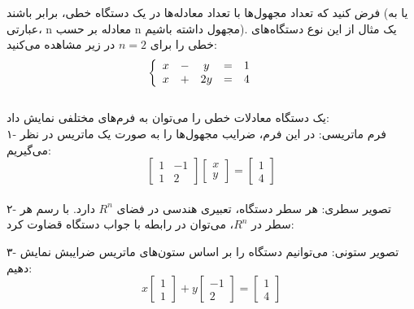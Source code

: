 فرض کنید که تعداد مجهول‌ها با تعداد معادله‌ها در یک دستگاه خطی، برابر باشند (یا به عبارتی، n معادله بر حسب n مجهول داشته باشیم). یک مثال از این نوع دستگاه‌های خطی را برای $n=2$ در زیر مشاهده می‌کنید:\\
\[
\left\{
\begin{array}{ccccc@{\qquad}l}
x & -  &  y   & = &1 \\
x  & +  & 2y   & = &4
\end{array}
\right.
\]\\
یک دستگاه معادلات خطی را می‌توان به فرم‌های مختلفی نمایش داد:\\
۱- فرم ماتریسی: در این فرم، ضرایب مجهول‌ها را به صورت یک ماتریس در نظر می‌گیریم:\\
\[{
	\begin{bmatrix}
	1 & -1\\
	1 & 2
	\end{bmatrix}}
{\begin{bmatrix}
	x\\
	y
	\end{bmatrix}}= 
{\begin{bmatrix}
	1\\
	4
	\end{bmatrix}}\]\\
۲- تصویر سطری: هر سطر دستگاه، تعبیری هندسی در فضای $R^n$ دارد. با رسم هر سطر در $R^n$، می‌توان در رابطه با جواب دستگاه قضاوت کرد:\\
\begin{center}
\end{center}
۳- تصویر ستونی: می‌توانیم دستگاه را بر اساس ستون‌های ماتریس ضرایبش نمایش دهیم:
\[
{x \begin{bmatrix}
	1\\
	1
	\end{bmatrix}+
	y \begin{bmatrix}
	-1\\
	2
	\end{bmatrix}}
=
\begin{bmatrix}
1\\
4
\end{bmatrix} 	
\]\\
